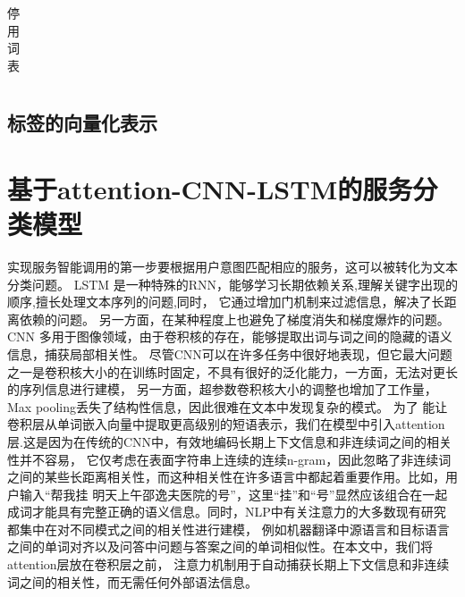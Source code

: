 \begin{table}[htb]
  \centering
  \caption{停用词表}
  \label{tab:RelatedResearchAbroad}
    \begin{tabular}{p{4cm}|p{4cm}|p{6cm}}
      \toprule
      
      \bottomrule
    \end{tabular}
\end{table}

\subsection{标签的向量化表示}

\section{基于attention-CNN-LSTM的服务分类模型}
实现服务智能调用的第一步要根据用户意图匹配相应的服务，这可以被转化为文本分类问题。
LSTM
是一种特殊的RNN，能够学习长期依赖关系,理解关键字出现的顺序,擅长处理文本序列的问题,同时，
它通过增加门机制来过滤信息，解决了长距离依赖的问题。 另一方面，在某种程度上也避免了梯度消失和梯度爆炸的问题。
CNN
多用于图像领域，由于卷积核的存在，能够提取出词与词之间的隐藏的语义信息，捕获局部相关性。
尽管CNN可以在许多任务中很好地表现，但它最大问题之一是卷积核大小的在训练时固定，不具有很好的泛化能力，一方面，无法对更长的序列信息进行建模，
另一方面，超参数卷积核大小的调整也增加了工作量，Max pooling丢失了结构性信息，因此很难在文本中发现复杂的模式。
为了
能让卷积层从单词嵌入向量中提取更高级别的短语表示，我们在模型中引入attention层.这是因为在传统的CNN中，有效地编码长期上下文信息和非连续词之间的相关性并不容易，
它仅考虑在表面字符串上连续的连续n-gram，因此忽略了非连续词之间的某些长距离相关性，而这种相关性在许多语言中都起着重要作用。比如，用户输入“帮我挂
明天上午邵逸夫医院的号”，这里“挂”和“号”显然应该组合在一起成词才能具有完整正确的语义信息。同时，NLP中有关注意力的大多数现有研究都集中在对不同模式之间的相关性进行建模，
例如机器翻译中源语言和目标语言之间的单词对齐以及问答中问题与答案之间的单词相似性。在本文中，我们将attention层放在卷积层之前，
注意力机制用于自动捕获长期上下文信息和非连续词之间的相关性，而无需任何外部语法信息。

